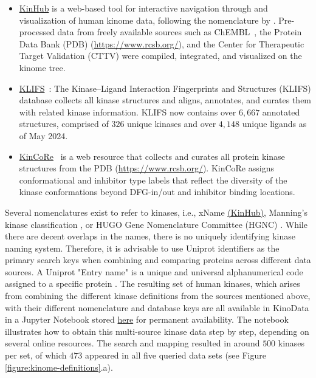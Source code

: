\documentclass[9pt,lessons]{livecoms}
\begin{document}
\begin{itemize}
\item {\href{http://www.kinhub.org/}{KinHub}} is a web-based tool for interactive navigation through and visualization of human kinome data, following the nomenclature by \citet{Manning2002}. Pre-processed data from freely available sources such as ChEMBL~\cite{zdrazil2023chembl}, the Protein Data Bank (PDB) (\url{https://www.rcsb.org/}), and the Center for Therapeutic Target Validation (CTTV) were compiled, integrated, and visualized on the kinome tree.~\cite{eid2017kinmap} 

\item {\href{https://klifs.net/}{KLIFS}}~\cite{Kanev2020}: The Kinase–Ligand Interaction Fingerprints and Structures (KLIFS) database collects all kinase structures and aligns, annotates, and curates them with related kinase information. KLIFS now contains over $6,667$ annotated structures, comprised of $326$ unique kinases and over $4,148$ unique ligands as of May 2024.

\item {\href{http://dunbrack.fccc.edu/kincore/home}{KinCoRe}}~\cite{Modi2021} is a web resource that collects and curates all protein kinase structures from the PDB (\url{https://www.rcsb.org/}). KinCoRe assigns conformational and inhibitor type labels that reflect the diversity of the kinase conformations beyond DFG-in/out and inhibitor binding locations. %

\end{itemize}

Several nomenclatures exist to refer to kinases, i.e., xName \href{http://www.kinhub.org/kinases.html}{(KinHub)}, Manning's kinase classification \cite{manning2002protein}, or HUGO Gene Nomenclature Committee (HGNC) \cite{eyre2006hugo}. 
While there are decent overlaps in the names, there is no uniquely identifying kinase naming system. 
Therefore, it is advisable to use Uniprot identifiers as the primary search keys when combining and comparing proteins across different data sources. 
A Uniprot "Entry name" is a unique and universal alphanumerical code assigned to a specific protein \cite{pundir2016uniprot, zaru2023uniprot}. 
The resulting set of human kinases, which arises from combining the different kinase definitions from the sources mentioned above, with their different nomenclature and database keys are all available in KinoData in a Jupyter Notebook stored \href{https://github.com/openkinome/kinodata/blob/master/human-kinases/human_kinases.ipynb}{here} for permanent availability.
The notebook illustrates how to obtain this multi-source kinase data step by step, depending on several online resources.
The search and mapping resulted in around $500$ kinases per set, of which $473$ appeared in all five queried data sets (see Figure \ref{figure:kinome-definitions}.a).
\end{document}
